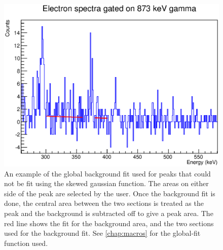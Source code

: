 \begin{figure}
    \centering
    \includegraphics[scale=0.6]{Analysis_Figs/Piecewise_example.eps}
    \caption{An example of the global background fit used for peaks that could not be fit using the skewed gaussian function. The areas on either side of the peak are selected by the user. Once the background fit is done, the central area between the two sections is treated as the peak and the background is subtracted off to give a peak area. The red line shows the fit for the background area, and the two sections used for the background fit. See \ref{chap:macros} for the global-fit function used.}
    \label{fig:piecewise}
\end{figure}